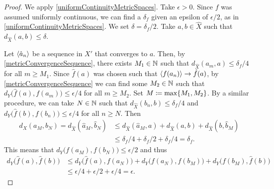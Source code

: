 \begin{proof}
We apply \ref{uniformContinuityMetricSpaces}. Take $\epsilon > 0$. Since $f$ was assumed uniformly continuous, we can find a $\delta_f$ given an epsilon of $\epsilon /2$, as in \ref{uniformContinuityMetricSpaces}. We set $\delta = \delta_f / 2$. Take $a,b\in \hat{X}$ such that $d_{\hat{X}}(a,b) \leq \delta$.

Let $\left\langle \hat{a}_n \right\rangle$ be a sequence in $X'$ that converges to $a$. Then, by \ref{metricConvergenceSequence}, there exists $M_1\in \mathbb{N}$ such that $d_{\hat{X}}(a_m, a)\leq \delta_f/4$ for all $m\geq M_1$. Since $\hat{f}(a)$ was chosen such that $\left\langle f(a_n) \right\rangle \to \hat{f}(a)$, by \ref{metricConvergenceSequence} we can find some $M_2\in\mathbb{N}$ such that $d_Y\big(\hat{f}(a), f(a_m)\big) \leq \epsilon /4$ for all $m\geq M_2$. Set $M \coloneqq \max\{M_1,M_2\}$. By a similar procedure, we can take $N\in \mathbb{N}$ such that $d_{\hat{X}}(b_n, b)\leq \delta_f/4$ and $d_Y\big(\hat{f}(b), f(b_n)\big) \leq \epsilon / 4$ for all $n\geq N$. Then
\begin{align*}
d_X(a_M, b_N) = d_{\hat{X}}(\hat{a}_M, \hat{b}_N) &\leq d_{\hat{X}}(\hat{a}_M, a) + d_{\hat{X}}(a,b) + d_{\hat{X}}(b, \hat{b}_M) \\
&\leq \delta_f/4 + \delta_f/2 + \delta_f/4 = \delta_f.
\end{align*}
This means that $d_Y\big(f(a_M), f(b_N)\big) \leq \epsilon/2$ and thus
\begin{align*}
d_Y\big(\hat{f}(a), \hat{f}(b)\big) &\leq d_Y\big(\hat{f}(a), f(a_N)\big) + d_Y\big(f(a_N), f(b_M)\big) + d_Y\big(f(b_M), \hat{f}(b)\big) \\
&\leq \epsilon / 4 + \epsilon / 2 + \epsilon / 4 = \epsilon.
\end{align*}
\end{proof}

